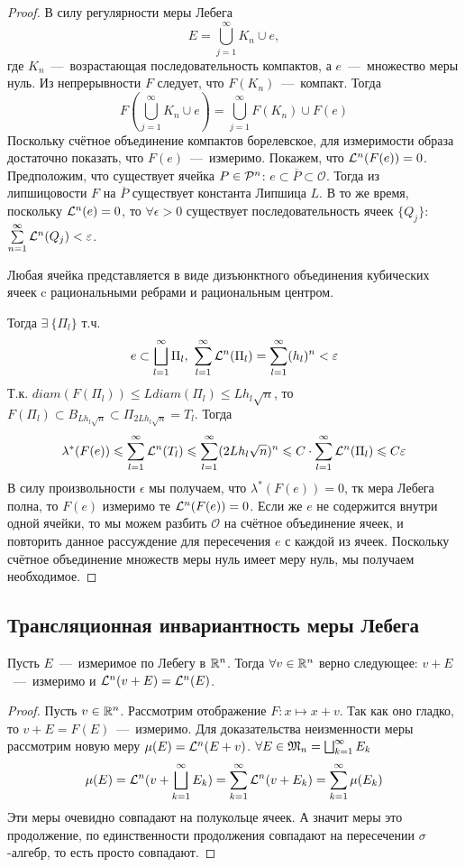 \begin{proof}
    В силу регулярности меры Лебега \[E = \bigcup\limits_{j = 1}^\infty K_n \cup e,\]
    где $K_n$~---~возрастающая последовательность компактов, а $e$~---~множество меры нуль. Из непрерывности $F$ следует, что $F(K_n)$~---~компакт. Тогда \[F(\bigcup\limits_{j = 1}^\infty K_n \cup e) = \bigcup\limits_{j = 1}^\infty F(K_n) \cup F(e)\]
    Поскольку счётное объединение компактов борелевское, для измеримости образа достаточно показать, что $F(e)$~---~измеримо. Покажем, что $\mathcal{L}^n(F(e)) = 0$. Предположим, что существует ячейка $P \in \mathcal{P}^n$: $e \subset \overline{P} \subset \mathcal{O}$. Тогда из липшицовости $F$ на $\overline{P}$ существует константа Липшица $L$. В то же время, поскольку $\mathcal{L}^n(e) = 0$, то $\forall \epsilon > 0$ существует последовательность ячеек $\{Q_j\}$: $\sum\limits_{n = 1}^\infty \mathcal{L}^n(Q_j) < \varepsilon$.
\begin{fact}
    Любая ячейка представляется в виде дизъюнктного объединения кубических ячеек c рациональными ребрами и рациональным центром.
\end{fact}
    Тогда $\exists \  \{\Pi_l\}$ т.ч. \[e \subset \bigsqcup\limits_{l = 1}^\infty \Pi_l, \ \sum\limits_{l = 1}^\infty \mathcal{L}^n(\Pi_l) = \sum\limits_{l = 1}^\infty (h_l)^n < \varepsilon\]
    Т.к. $diam(F(\Pi_l)) \leq Ldiam(\Pi_l) \leq Lh_l\sqrt{n}$,
    то $F(\Pi_l) \subset B_{Lh_l\sqrt{n}} \subset \Pi_{2Lh_l\sqrt{n}} = T_l$. Тогда \[\lambda^*(F(e)) \leqslant \sum\limits_{l = 1}^\infty \mathcal{L}^n(T_l) \leqslant \sum\limits_{l = 1}^\infty (2Lh_l\sqrt{n})^n \leqslant C\cdot\sum\limits_{l = 1}^\infty \mathcal{L}^n(\Pi_l) \leqslant C\varepsilon\]
    В силу произвольности $\epsilon$ мы получаем, что $\lambda^*(F(e)) = 0$, тк мера Лебега полна, то $F(e)$ измеримо те $\mathcal{L}^n(F(e)) = 0$. Если же $e$ не содержится внутри одной ячейки, то мы можем разбить $\mathcal{O}$ на счётное объединение ячеек, и повторить данное рассуждение для пересечения $e$ с каждой из ячеек. Поскольку счётное объединение множеств меры нуль имеет меру нуль, мы получаем необходимое. 
\end{proof}
\subsection{Трансляционная инвариантность меры Лебега}
\begin{theorem}
    Пусть $E$~---~измеримое по Лебегу в $\mathbb{R}^n$. Тогда $\forall v \in \mathbb{R}^n$ верно следующее: $v + E$~---~измеримо и $\mathcal{L}^n(v + E) = \mathcal{L}^n(E)$.
\end{theorem}
\begin{proof}
    Пусть $v \in \mathbb{R}^n$. Рассмотрим отображение $F: x \mapsto x + v$. Так как оно гладко, то $v + E = F(E)$~---~измеримо. Для доказательства неизменности меры рассмотрим новую меру $\mu(E) = \mathcal{L}^n(E + v)$.  $\forall E \in \mathfrak{M}_n = \bigsqcup_{k=1}^{\infty}E_k$
    \[
    \mu(E) = \mathcal{L}^n( v + \bigsqcup_{k=1}^{\infty} E_k) = \sum_{k=1}^{\infty}\mathcal{L}^n(v + E_k) = \sum_{k=1}^{\infty}\mu(E_k)
    \]
    Эти меры очевидно совпадают на полукольце ячеек. А значит меры это продолжение, по единственности продолжения совпадают на пересечении $\sigma$-алгебр, то есть просто совпадают.
\end{proof}

